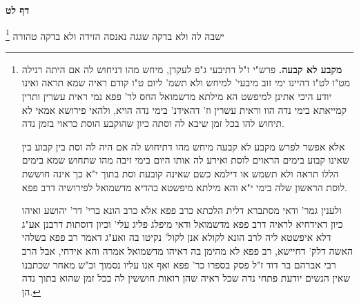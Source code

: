\documentclass[12pt, openany]{book}
\newcommand{\sethebfont}{
\fontsize{10.5pt}{21.0pt} \selectfont
}
\newcommand{\twocol}[1]{
	{\sethebfont \begin{multicols}{2}
			#1
	\end{multicols}}	
}
\newcommand{\sectname}{}
\newcommand{\newsection}[1]{
	\addcontentsline{toc}{section}{#1}
	\renewcommand{\sectname}{#1}	
	\vspace{-\baselineskip}
	\begin{center}
		\textbf{%
\fontsize{16pt}{16pt}\selectfont
			#1}
	\end{center}
	\vspace{-\baselineskip}
	\nopagebreak
}
\newcommand{\footnotecomment}[1]{\footnote{#1}}
\newcommand{\commenta}[1]{\footnotecomment{#1}}
\begin{document}
\newsection{דף לט}
\twocol{ישבה לה ולא בדקה שגגה נאנסה הזידה ולא בדקה טהורה 
\commenta{\textbf{מקבע לא קבעה.}  פרש"י ז"ל דתיבעי ג"פ לעקרן, מיחש מהו דניחוש לה אם היתה רנילה מט"ו לט"ו דהיינו ימי זוב מיבעי' למיחש ולא תשמ' ליום ט"ו קודם ראיה שמא תראה ואינו יודע היכי אתינן למיפשט הא מילתא מדשמואל החס לר' פפא נמי ראית עשרין ותרין קמייאתא בימי נדה הוו וראית עשרין וז' דהאידנ' בימי נדה הויא, ולהאי פירושא אמאי לא תיחוש להו בכל זמן שיבא לה וסתה כיון שהוקבע הוסת כראוי בזמן נדה.\par  אלא אפשר לפרש מקבע לא קבעה מיחש מהו דתיחוש לה אם היה לה וסת בין קבוע בין שאינו קבוע בימים הראוים לוסת ואירע לה אותו היום בימי זיבה מהו שתחוש שמא בימים הללו תראה ולא תשמש או דילמא כשם שאינה קובעת וסת בתוך י"א כך אינה חוששת לוסת הראשון שלה בימי י"א והא מילתא מיפשטא בהדיא מדשמואל לפירושיה דרב פפא.\par  ולענין גמר' ודאי מסתברא דלית הלכתא כרב פפא אלא כרב הונא ברי' דר' יהושע ואיהו כיון דאידחיא לראיה דרב פפא מדשמואל ודאי מיפלג פליג עלי' וכיון דוסתות דרבנן אע"ג דלא איפשטא ליה לרב הונא לקולא אנן לקול' נקיטו בה ואע"ג דאמר רב פפא בשלהי האשה דלק' דחיישא, רב פפא לא מהימן בה דאיהו מדשמואל אמרה והא אידחי, אבל הרב רבי אברהם בר דוד ז"ל פסק בספרו כר' פפא ואף אנו עליו נסמוך וכ"ש מאחר שכתבנו שאין הנשים יודעת פתחי נדה שכל ראיה שהן רואות חוששין לה בכל זמן שהוא בתוך נדה הן. }

}
\end{document}
